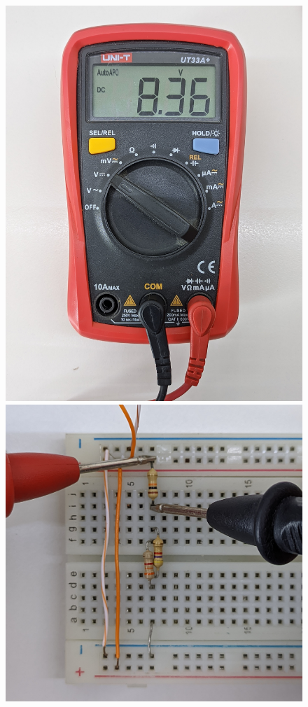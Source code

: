 \documentclass[a4paper,12pt, spanish]{report}
\begin{document}
      \begin{figure}[H]
        \centering
          \begin{minipage}{0.3\textwidth}
            \centering
            \includegraphics[width=1\linewidth]{pictures/mult-v_r1.jpg}
            \includegraphics[width=1\linewidth]{pictures/prot-v_r1.jpg}

\end{minipage}
\end{figure}
\end{document}
